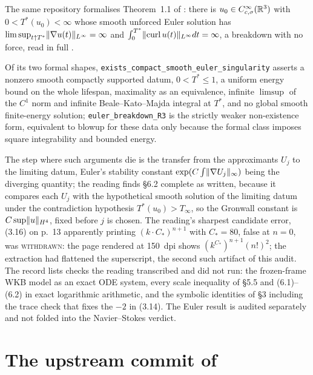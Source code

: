 \documentclass[11pt]{article}
\newcommand{\lean}[1]{\texttt{#1}}
\newcommand{\Lp}[1]{L^{#1}}
\begin{document}
The same repository formalises Theorem~1.1 of \cite{OAIE}: there is
$u_0\in C^\infty_{c,\sigma}(\mathbb{R}^3)$ with $0<T^*(u_0)<\infty$ whose smooth unforced Euler
solution has $\limsup_{t\uparrow T^*}\norm{\nabla u(t)}_{\Lp\infty}=\infty$ and
$\int_0^{T^*}\norm{\operatorname{curl}u(t)}_{\Lp\infty}dt=\infty$, a breakdown with no
force, read in full \cite{Records}. {\sloppy Of its two formal shapes,
\lean{exists\_compact\_smooth\_euler\_singularity} asserts a nonzero smooth compactly
supported datum, $0<T^*\le1$, a uniform energy bound on the whole lifespan, maximality as
an equivalence, infinite $\limsup$ of the $C^1$ norm and infinite Beale--Kato--Majda
integral at $T^*$, and no global smooth finite-energy solution; \lean{euler\_breakdown\_R3}
is the strictly weaker non-existence form, equivalent to blowup for these data only because
the formal class imposes square integrability and bounded energy.\par}

The step where such arguments die is the
transfer from the approximants $U_j$ to the limiting datum, Euler's stability constant
$\exp(C\int\lVert \nabla U_j \rVert_\infty)$ being the diverging quantity; the reading finds \S6.2
complete as written, because it compares each $U_j$ with the hypothetical smooth solution
of the limiting datum under the contradiction hypothesis $T^*(u_0)>T_\infty$, so the
Gronwall constant is $C\sup\lVert u \rVert_{H^4}$, fixed before $j$ is chosen. The reading's
sharpest candidate error, (3.16) on p.~13 apparently printing $(k\cdot C_*)^{n+1}$ with
$C_*=80$, false at $n=0$, was \textsc{withdrawn}: the page rendered at 150~dpi shows
$(k^{C_*})^{n+1}(n!)^2$; the extraction had flattened the superscript, the second such
artifact of this audit. The record lists \EulerChecksUnrun{}
checks the reading transcribed and did not run: the frozen-frame WKB model as an exact ODE
system, every scale inequality of \S5.5 and (6.1)--(6.2) in exact logarithmic arithmetic,
and the symbolic identities of \S3 including the trace check that fixes the $-2$ in (3.14).
The Euler result is audited separately and not folded into the Navier--Stokes verdict.

\section{The upstream commit of \UpCommitDate}\label{sec:upstream}
\end{document}
